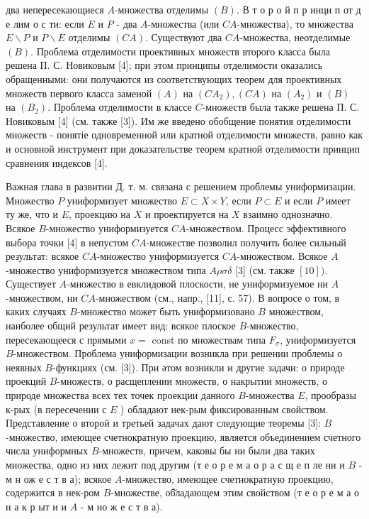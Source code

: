 \documentclass[10pt]{article}
\begin{document}
два непересекающиеся $A$-множества отделимы $(B)$. В т о р о й п р инци п от д е лим о с ти: если $E$ и $P$ - два $A$-множества (или $C A$-множества), то множества $E \backslash P$ и $P \backslash E$ отделимы $(C A)$. Существуют два $C A$-множества, неотделимые $(B)$. Проблема отделимости проективных множеств второго класса была решена П. С. Новиковым [4]; при этом принципы отделимости оказались обращенными: они получаются из соответствующих теорем для проективных множеств первого класса заменой $(A)$ на $\left(C A_{2}\right),(C A)$ на $\left(A_{2}\right)$ и $(B)$ на $\left(B_{2}\right)$. Проблема отделимости в классе $C$-множеств была также решена П. С. Новиковым [4] (см. также [3]). Им же введено обобщение понятия отделимости множеств - понятіе одновременной или кратной отделимости множеств, равно как и основной инструмент при доказательстве теорем кратной отделимости принцип сравнения индексов [4].



Важная глава в развитии Д. т. м. связана с решением проблемы униформизации. Множество $P$ униформизует множество $E \subset X \times Y$, если $P \subset E$ и если $P$ имеет ту же, что и $E$, проекцию на $X$ и проектируется на $X$ взаимно однозначно. Всякое $B$-множество униформизуется $C A$-множеством. Процесс эффективного выбора точки [4] в непустом $C A$-множестве позволил получить более сильный результат: всякое $C A$-множество униформизуется $C A$-множеством. Всякое $A$-множество униформизуется множеством типа $A \rho \sigma \delta$ [3] (см. также $[10])$. Существует $A$-множество в евклидовой плоскости, не униформизуемое ни $A$-множеством, ни $C A$-множеством (см., напр., [11], с. 57). В вопросе о том, в каких случаях $B$-множество может быть униформизовано $B$ множеством, наиболее общий результат имеет вид: всякое плоское $B$-множество, пересекающееся с прямыми $x=$ const по множествам типа $F_{\sigma}$, униформизуется $B$-множеством. Проблема униформизации возникла при решении проблемы о неявных $B$-функциях (см. [3]). При әтом возникли и другие задачи: о природе проекций $B$-множеств, о расщеплении множеств, о накрытии множеств, о природе множества всех тех точек проекции данного $B$-множества $E$, прообразы к-рых (в пересечении с $E$ ) обладают нек-рым фиксированным свойством. Представление о второй и третьей задачах дают следующие теоремы [3]: $B$-множество, имеющее счетнократную проекцию, является объединением счетного числа униформных $B$-множеств, причем, каковы бы ни были два таких множества, одно из них лежит под другим (т е о р е м а о р а с щ е п ле ни и $B$ - м н ож е с т в а); всякое $A$-множество, имеющее счетнократную проекцию, содержится в нек-ром $B$-множестве, об̆ладающем этим свойством (т е о р е м а о н а к р ыт и и $A$ - м но ж е с т в а).
\end{document}
